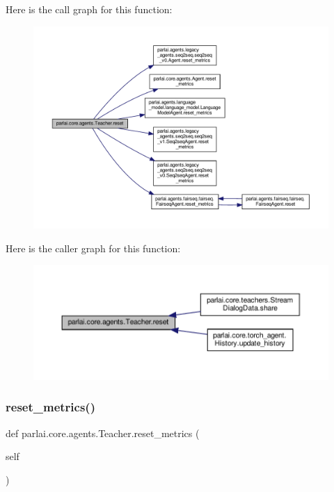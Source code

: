 Here is the call graph for this function\+:
\nopagebreak
\begin{figure}[H]
\begin{center}
\leavevmode
\includegraphics[width=350pt]{classparlai_1_1core_1_1agents_1_1Teacher_a3b1fe4cf4ea53c9b2ce28435391ad081_cgraph}
\end{center}
\end{figure}
Here is the caller graph for this function\+:
\nopagebreak
\begin{figure}[H]
\begin{center}
\leavevmode
\includegraphics[width=350pt]{classparlai_1_1core_1_1agents_1_1Teacher_a3b1fe4cf4ea53c9b2ce28435391ad081_icgraph}
\end{center}
\end{figure}
\mbox{\label{classparlai_1_1core_1_1agents_1_1Teacher_a3f14618f0f49c57a6fbcb4f80f8a1de4}} 
\subsubsection{\texorpdfstring{reset\+\_\+metrics()}{reset\_metrics()}}
{\footnotesize\ttfamily def parlai.\+core.\+agents.\+Teacher.\+reset\+\_\+metrics (\begin{DoxyParamCaption}\item[{}]{self }\end{DoxyParamCaption})}

